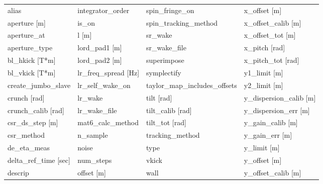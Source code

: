  \begin{tabular}{llll} \toprule
alias                            & integrator_order                 & spin_fringe_on                   & x_offset [m]                     \\
aperture [m]                     & is_on                            & spin_tracking_method             & x_offset_calib [m]               \\
aperture_at                      & l [m]                            & sr_wake                          & x_offset_tot [m]                 \\
aperture_type                    & lord_pad1 [m]                    & sr_wake_file                     & x_pitch [rad]                    \\
bl_hkick [T*m]                   & lord_pad2 [m]                    & superimpose                      & x_pitch_tot [rad]                \\
bl_vkick [T*m]                   & lr_freq_spread [Hz]              & symplectify                      & y1_limit [m]                     \\
create_jumbo_slave               & lr_self_wake_on                  & taylor_map_includes_offsets      & y2_limit [m]                     \\
crunch [rad]                     & lr_wake                          & tilt [rad]                       & y_dispersion_calib [m]           \\
crunch_calib [rad]               & lr_wake_file                     & tilt_calib [rad]                 & y_dispersion_err [m]             \\
csr_ds_step [m]                  & mat6_calc_method                 & tilt_tot [rad]                   & y_gain_calib [m]                 \\
csr_method                       & n_sample                         & tracking_method                  & y_gain_err [m]                   \\
de_eta_meas                      & noise                            & type                             & y_limit [m]                      \\
delta_ref_time [sec]             & num_steps                        & vkick                            & y_offset [m]                     \\
descrip                          & offset [m]                       & wall                             & y_offset_calib [m]               \\

\end{tabular}
